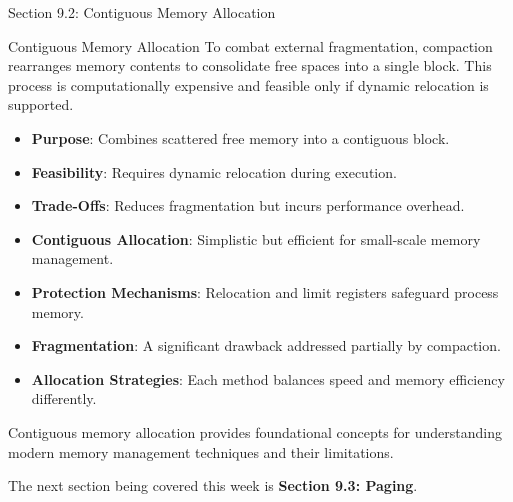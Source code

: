 \begin{notes}{Section 9.2: Contiguous Memory Allocation}
\begin{notes}{Contiguous Memory Allocation}
        To combat external fragmentation, compaction rearranges memory contents to consolidate free spaces into a single block. This process is computationally expensive and feasible only if dynamic 
        relocation is supported.
        
        \begin{highlight}[Compaction]
            \begin{itemize}
                \item \textbf{Purpose}: Combines scattered free memory into a contiguous block.
                \item \textbf{Feasibility}: Requires dynamic relocation during execution.
                \item \textbf{Trade-Offs}: Reduces fragmentation but incurs performance overhead.
            \end{itemize}
        \end{highlight}
        
        \begin{highlight}
            \begin{itemize}
                \item \textbf{Contiguous Allocation}: Simplistic but efficient for small-scale memory management.
                \item \textbf{Protection Mechanisms}: Relocation and limit registers safeguard process memory.
                \item \textbf{Fragmentation}: A significant drawback addressed partially by compaction.
                \item \textbf{Allocation Strategies}: Each method balances speed and memory efficiency differently.
            \end{itemize}
            Contiguous memory allocation provides foundational concepts for understanding modern memory management techniques and their limitations.
        \end{highlight}
    \end{notes}
\end{notes}

The next section being covered this week is \textbf{Section 9.3: Paging}.

